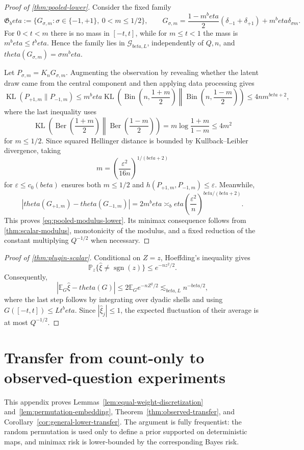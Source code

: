\documentclass[11pt]{article}
\def\beta{beta}%
\def\theta{theta}%
\newcommand{\Pp}{\mathbb P}
\newcommand{\E}{\mathbb E}
\newcommand{\sgn}{\operatorname{sgn}}
\newcommand{\KL}{\operatorname{KL}}
\newcommand{\Bin}{\operatorname{Bin}}
\newcommand{\Ber}{\operatorname{Ber}}
\newcommand{\calG}{\mathcal G}
\newcommand{\eps}{\varepsilon}
\begin{document}
\begin{proof}[Proof of \cref{thm:pooled-lower}]
Consider the fixed family
\[
\mathfrak G_\beta
:=
\{G_{\sigma,m}:\sigma\in\{-1,+1\},\ 0<m\le1/2\},
\qquad
G_{\sigma,m}
=
\frac{1-m^\beta}{2}(\delta_{-1}+\delta_{+1})
+m^\beta\delta_{\sigma m}.
\]
For $0<t<m$ there is no mass in $[-t,t]$, while for $m\le t<1$ the mass is $m^\beta\le t^\beta$.  Hence the family lies in $\calG_{\beta,L}$, independently of $Q,n$, and $\theta(G_{\sigma,m})=\sigma m^\beta$.

Let $P_{\sigma,m}=K_nG_{\sigma,m}$.  Augmenting the observation by revealing whether the latent draw came from the central component and then applying data processing gives
\[
\KL(P_{+1,m}\|P_{-1,m})
\le
m^\beta
\KL\!\left(
\Bin\left(n,\frac{1+m}{2}\right)
\middle\|
\Bin\left(n,\frac{1-m}{2}\right)
\right)
\le 4nm^{\beta+2},
\]
where the last inequality uses
\[
\KL\!\left(
\Ber\left(\frac{1+m}{2}\right)
\middle\|
\Ber\left(\frac{1-m}{2}\right)
\right)
=
m\log\frac{1+m}{1-m}
\le4m^2
\]
for $m\le1/2$.  Since squared Hellinger distance is bounded by Kullback--Leibler divergence, taking
\[
m
=
\left(\frac{\eps^2}{16n}\right)^{1/(\beta+2)}
\]
for $\eps\le c_0(\beta)$ ensures both $m\le1/2$ and $h(P_{+1,m},P_{-1,m})\le\eps$.  Meanwhile,
\[
|\theta(G_{+1,m})-\theta(G_{-1,m})|
=2m^\beta
\asymp_\beta
\left(\frac{\eps^2}{n}\right)^{\beta/(\beta+2)}.
\]
This proves \eqref{eq:pooled-modulus-lower}.  Its minimax consequence follows from \cref{thm:scalar-modulus}, monotonicity of the modulus, and a fixed reduction of the constant multiplying $Q^{-1/2}$ when necessary.
\end{proof}

\begin{proof}[Proof of \cref{thm:plugin-scalar}]
Conditional on $Z=z$, Hoeffding's inequality gives
\[
\Pp_z\{\widehat\xi\ne\sgn(z)\}
\le e^{-nz^2/2}.
\]
Consequently,
\[
|\E_G\widehat\xi-\theta(G)|
\le2\E_G e^{-nZ^2/2}
\lesssim_{\beta,L}n^{-\beta/2},
\]
where the last step follows by integrating over dyadic shells and using $G([-t,t])\le Lt^\beta$.  Since $|\widehat\xi_j|\le1$, the expected fluctuation of their average is at most $Q^{-1/2}$.
\end{proof}

\section{Transfer from count-only to observed-question experiments}
\label{app:observed-transfer}

This appendix proves Lemmas~\ref{lem:equal-weight-discretization} and~\ref{lem:permutation-embedding}, Theorem~\ref{thm:observed-transfer}, and Corollary~\ref{cor:general-lower-transfer}.  The argument is fully frequentist: the random permutation is used only to define a prior supported on deterministic maps, and minimax risk is lower-bounded by the corresponding Bayes risk.
\end{document}
